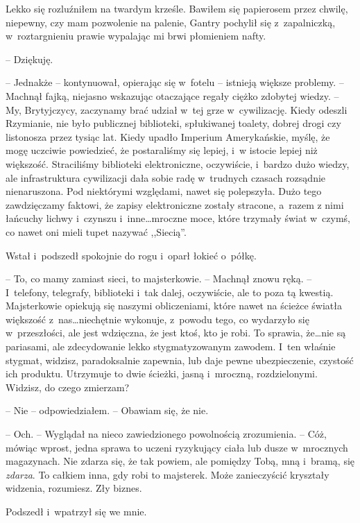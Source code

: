 \documentclass[oneside,polish,11pt,sfheadings]{mwbk}
\begin{document}
Lekko się rozluźniłem na twardym krześle. Bawiłem się papierosem przez
chwilę, niepewny, czy mam pozwolenie na palenie, Gantry pochylił się z~zapalniczką, w~roztargnieniu prawie wypalając mi brwi płomieniem nafty.

-- Dziękuję.

-- Jednakże -- kontynuował, opierając się w~fotelu -- istnieją większe
problemy. -- Machnął fajką, niejasno wskazując otaczające regały ciężko
zdobytej wiedzy. -- My, Brytyjczycy, zaczynamy brać udział w~tej grze w~cywilizację. Kiedy odeszli Rzymianie, nie było publicznej biblioteki,
spłukiwanej toalety, dobrej drogi czy listonosza przez tysiąc lat. Kiedy
upadło Imperium Amerykańskie, myślę, że mogę uczciwie powiedzieć, że
postaraliśmy się lepiej, i~w istocie lepiej niż większość. Straciliśmy
biblioteki elektroniczne, oczywiście, i~bardzo dużo wiedzy, ale
infrastruktura cywilizacji dała sobie radę w~trudnych czasach rozsądnie
nienaruszona. Pod niektórymi względami, nawet się polepszyła. Dużo tego
zawdzięczamy faktowi, że zapisy elektroniczne zostały stracone, a~razem
z nimi łańcuchy lichwy i~czynszu i~inne\ldots mroczne moce, które trzymały
świat w~czymś, co nawet oni mieli tupet nazywać ,,Siecią''.

Wstał i~podszedł spokojnie do rogu i~oparł łokieć o~półkę. 

-- To, co mamy
zamiast sieci, to majsterkowie. -- Machnął znowu ręką. -- I~telefony,
telegrafy, biblioteki i~tak dalej, oczywiście, ale to poza tą kwestią.
Majsterkowie opiekują się naszymi obliczeniami, które nawet na ścieżce
światła większość z~nas\ldots niechętnie wykonuje, z~powodu tego, co
wydarzyło się w~przeszłości, ale jest wdzięczna, że jest ktoś, kto je
robi. To sprawia, że\ldots nie są pariasami, ale zdecydowanie lekko
stygmatyzowanym zawodem. I~ten właśnie stygmat, widzisz, paradoksalnie
zapewnia, lub daje pewne ubezpieczenie, czystość ich produktu. Utrzymuje
to dwie ścieżki, jasną i~mroczną, rozdzielonymi. Widzisz, do czego
zmierzam?

-- Nie -- odpowiedziałem. -- Obawiam się, że nie.

-- Och. -- Wyglądał na nieco zawiedzionego powolnością zrozumienia. -- Cóż,
mówiąc wprost, jedna sprawa to uczeni ryzykujący ciała lub dusze w~mrocznych magazynach. Nie zdarza się, że tak powiem, ale pomiędzy Tobą,
mną i~bramą, się \textit{zdarza}. To całkiem inna, gdy robi to majsterek.
Może zanieczyścić kryształy widzenia, rozumiesz. Zły biznes.

Podszedł i~wpatrzył się we mnie. 
\end{document}
